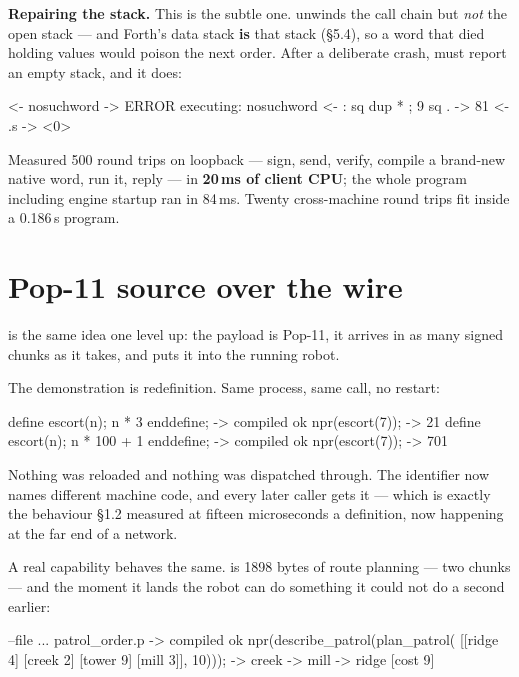 \textbf{Repairing the stack.} This is the subtle one. 
unwinds the call chain but \emph{not} the open stack --- and Forth's data
stack \textbf{is} that stack (\S5.4), so a word that died holding values
would poison the next order. After a deliberate crash,  must report
an empty stack, and it does:

\begin{repl}
  <- nosuchword
  -> ERROR executing: nosuchword
  <- : sq dup * ; 9 sq .
  -> 81
  <- .s
  -> <0>
\end{repl}

\begin{callout}{Measured}
500 round trips on loopback --- sign, send, verify, compile a brand-new
native word, run it, reply --- in \textbf{20\,ms of client CPU}; the whole
program including engine startup ran in 84\,ms. Twenty cross-machine round
trips fit inside a 0.186\,s program.
\end{callout}

\section{Pop-11 source over the wire}

 is the same idea one level up: the payload is Pop-11, it
arrives in as many signed chunks as it takes, and  puts
it into the running robot.

The demonstration is redefinition. Same process, same call, no restart:

\begin{repl}
define escort(n); n * 3 enddefine;        ->  compiled ok
npr(escort(7));                           ->  21
define escort(n); n * 100 + 1 enddefine;  ->  compiled ok
npr(escort(7));                           ->  701
\end{repl}

Nothing was reloaded and nothing was dispatched through. The identifier
 now names different machine code, and every later caller gets
it --- which is exactly the behaviour \S1.2 measured at fifteen microseconds
a definition, now happening at the far end of a network.

A real capability behaves the same.  is
1898 bytes of route planning --- two chunks --- and the moment it lands the
robot can do something it could not do a second earlier:

\begin{repl}
--file ... patrol_order.p                             ->  compiled ok
npr(describe_patrol(plan_patrol(
    [[ridge 4] [creek 2] [tower 9] [mill 3]], 10)));  ->  creek -> mill -> ridge [cost 9]
\end{repl}

